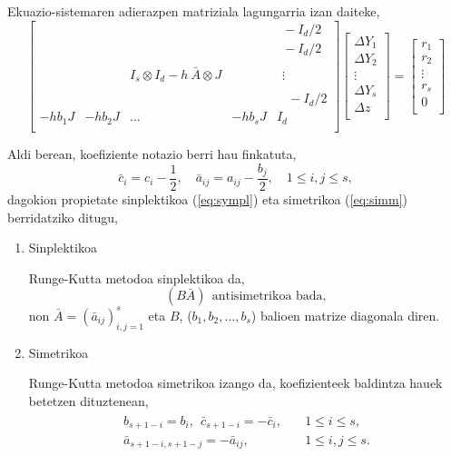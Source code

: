 Ekuazio-sistemaren adierazpen matriziala lagungarria izan daiteke,
\begin{equation*}
\begin{bmatrix}
    &      &      &  & \ \ -I_d/2 \\
    &      &      &  & \ \ -I_d/2 \\
    &      &      &  & \ \      \\    
    &  & I_s \otimes I_d- h \ \bar{A} \otimes J & & \ \ \vdots \\
    &      &      &  & \ \      \\
    &      &      &  & \ \ \ \ -I_d/2    \\
-hb_1 J & -hb_2 J & \dots & -hb_s J &  I_d\\ 
\end{bmatrix}
\begin{bmatrix}
\Delta Y_1 \\
\Delta Y_2 \\
\vdots \\
\Delta Y_s \\
\Delta z\\
\end{bmatrix}=
\begin{bmatrix}
r_1 \\
r_2 \\
\vdots \\
r_s \\
0\\
\end{bmatrix}
\end{equation*} 

Aldi berean, koefiziente notazio berri hau finkatuta,
\begin{equation*}
\bar{c}_i=c_i-\frac{1}{2}, \quad \bar{a}_{ij}=a_{ij}-\frac{b_j}{2}, \quad 1\leqslant i,j \leqslant s,
\end{equation*}
dagokion propietate sinplektikoa (\ref{eq:sympl}) eta simetrikoa (\ref{eq:simm}) berridatziko ditugu,
\begin{enumerate}
\item {Sinplektikoa}

Runge-Kutta metodoa sinplektikoa da,
\begin{equation}
\label{eq:eqlineala}
(B \bar{A}) \ \ \mbox{antisimetrikoa bada},
\end{equation}
non $\bar{A}=(\bar{a}_{ij})_{i,j=1}^s$ eta $B$, ($b_1,b_2,\dots,b_s$) balioen matrize diagonala diren.

\item {Simetrikoa}

Runge-Kutta metodoa simetrikoa izango da, koefizienteek baldintza hauek betetzen dituztenean,
\begin{align}
\label{eq:simm2}
\begin{split}
b_{s+1-i}=b_i, \ \ \bar{c}_{s+1-i}=-\bar{c}_i,& \quad 1\leq i \leq s, \\
\bar{a}_{s+1-i,s+1-j}=-\bar{a}_{ij},& \quad 1\leq i,j \leq s. 
\end{split}
\end{align} 

\end{enumerate}

